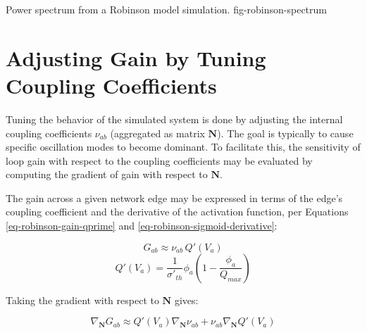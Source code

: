 {Power spectrum from a Robinson model simulation.}
{fig-robinson-spectrum}

%
%
\section{Adjusting Gain by Tuning Coupling Coefficients}
\label{sect-robinson-math-tuning}
%
\newcommand{\deln}{\nabla_{\mathbf{N}}}

Tuning the behavior of the simulated system is done by adjusting the
internal coupling coefficients $\nu_{ab}$ (aggregated as matrix
$\mathbf{N}$). The goal is typically to cause specific oscillation modes
to become dominant. To facilitate this, the sensitivity of loop gain with
respect to the coupling coefficients may be evaluated by computing the
gradient of gain with respect to $\mathbf{N}$.

The gain across a given network edge may be expressed in terms of the
edge's coupling coefficient and the derivative of the activation function,
per Equations \ref{eq-robinson-gain-qprime} and
\ref{eq-robinson-sigmoid-derivative}:

\begin{equation}
G_{ab} \approx \nu_{ab} \, Q'(V_a)
\end{equation}
%
\begin{equation}
Q'(V_a) = \frac{1}{\sigma'_{th}} \phi_a
\left ( 1 - \frac{\phi_a}{Q_{max}} \right )
\end{equation}

Taking the gradient with respect to $\mathbf{N}$ gives:

\begin{equation}
\deln G_{ab} \approx Q'(V_a) \deln \nu_{ab} + \nu_{ab} \deln Q'(V_a)
\label{eq-robinson-gain-gradient}
\end{equation}

